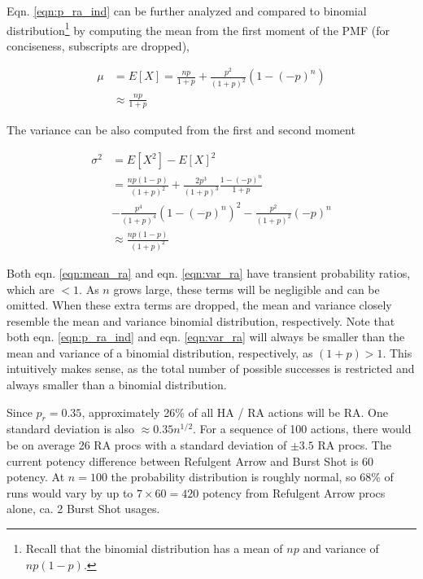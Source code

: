 Eqn. \ref{eqn:p_ra_ind} can be further analyzed and compared to binomial distribution\footnote{Recall that the binomial distribution has a mean of $np$ and variance of $np(1-p)$.} by computing the mean from the first moment of the PMF (for conciseness, subscripts are dropped),

\begin{equation}
  \begin{split}
  \mu &= E[X] = \frac{np}{1+p} + \frac{p^2}{(1+p)^2}(1 - (-p)^n) \\
      &\approx \frac{np}{1+p}
  \end{split}
  \label{eqn:mean_ra}
\end{equation}

The variance can be also computed from the first and second moment

\begin{equation}
  \begin{split}
  \sigma^2 &= E[X^2] - E[X]^2 \\
  &= \frac{np(1-p)}{(1+p)^2} + \frac{2p^3}{(1+p)^3}\frac{1-(-p)^n}{1+p} \\
  &- \frac{p^4}{(1+p)^4}(1-(-p)^n)^2 - \frac{p^2}{(1+p)^2}(-p)^n \\
  &\approx \frac{np(1-p)}{(1+p)^2}
  \end{split}
  \label{eqn:var_ra}
\end{equation}

Both eqn. \ref{eqn:mean_ra} and eqn. \ref{eqn:var_ra} have transient probability ratios, which are $< 1$. As $n$ grows large, these terms will be negligible and can be omitted. When these extra terms are dropped, the mean and variance closely resemble the mean and variance binomial distribution, respectively. Note that both eqn. \ref{eqn:p_ra_ind} and eqn. \ref{eqn:var_ra} will always be smaller than the mean and variance of a binomial distribution, respectively, as $(1+p) > 1$. This intuitively makes sense, as the total number of possible successes is restricted and always smaller than a binomial distribution.

Since $p_r = 0.35$, approximately 26\% of all HA / RA actions will be RA. One standard deviation is also $\approx 0.35 n^{1/2}$. For a sequence of 100 actions, there would be on average 26 RA procs with a standard deviation of $\pm3.5$ RA procs. The current potency difference between Refulgent Arrow and Burst Shot is 60 potency. At $n=100$ the probability distribution is roughly normal, so 68\% of runs would vary by up to $7 \times 60 = 420$ potency from Refulgent Arrow procs alone, ca. 2 Burst Shot usages.

